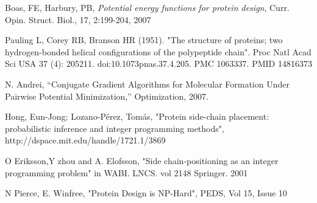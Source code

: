 \documentclass{article} %
\begin{document}
\begin{thebibliography}{99}

	Boas, FE, Harbury, PB,
	\emph{Potential energy functions for protein design},
	Curr. Opin. Struct. Biol., 17, 2:199-204, 
	2007

Pauling L, Corey RB, Branson HR (1951). "The structure of proteins; 
two hydrogen-bonded helical configurations of the polypeptide chain". Proc Natl Acad Sci USA 37 (4): 205211. 
doi:10.1073\/pnas.37.4.205. PMC 1063337. PMID 14816373

N. Andrei, “Conjugate Gradient Algorithms for Molecular Formation Under
Pairwise Potential Minimization,” Optimization, 2007.

Hong, Eun-Jong; Lozano-Pérez, Tomás, "Protein side-chain placement: probabilistic inference and integer programming methods", http://dspace.mit.edu/handle/1721.1/3869

O Eriksson,Y zhou and A. Elofsson, "Side chain-positioning as an integer programming problem" in WABI. LNCS. vol 2148 Springer. 2001

N Pierce, E. Winfree, "Protein Design is NP-Hard", PEDS, Vol 15, Issue 10



\end{thebibliography}



%
%	
%
%	
%
\end{document}
